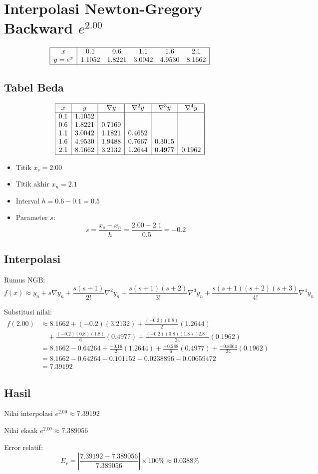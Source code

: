 \documentclass{article}
\begin{document}
\section*{Interpolasi Newton-Gregory Backward \( e^{2.00} \)}


\[
\begin{array}{|c|ccccc|}
\hline
x & 0.1 & 0.6 & 1.1 & 1.6 & 2.1 \\
y = e^x & 1.1052 & 1.8221 & 3.0042 & 4.9530 & 8.1662 \\
\hline
\end{array}
\]

\subsection*{Tabel Beda}
\[
\begin{array}{|c|c|c|c|c|c|}
\hline
x & y & \nabla y & \nabla^2 y & \nabla^3 y & \nabla^4 y \\
\hline
0.1 & 1.1052 & & & & \\
0.6 & 1.8221 & 0.7169 & & & \\
1.1 & 3.0042 & 1.1821 & 0.4652 & & \\
1.6 & 4.9530 & 1.9488 & 0.7667 & 0.3015 & \\
2.1 & 8.1662 & 3.2132 & 1.2644 & 0.4977 & 0.1962 \\
\hline
\end{array}
\]


\begin{itemize}
\item Titik \( x_s = 2.00 \)
\item Titik akhir \( x_n = 2.1 \)
\item Interval  \(h = 0.6 - 0.1 = 0.5 \)
\item Parameter \( s \):
\[
s = \frac{x_s - x_n}{h} = \frac{2.00 - 2.1}{0.5} = -0.2
\]
\end{itemize}

\subsection*{Interpolasi}
Rumus NGB:
\[
f(x) \approx y_n + s \nabla y_n + \frac{s(s+1)}{2!} \nabla^2 y_n + \frac{s(s+1)(s+2)}{3!} \nabla^3 y_n + \frac{s(s+1)(s+2)(s+3)}{4!} \nabla^4 y_n
\]

Substitusi nilai:
\[
\begin{aligned}
f(2.00) &\approx 8.1662 + (-0.2)(3.2132) + \frac{(-0.2)(0.8)}{2}(1.2644) \\
&\quad + \frac{(-0.2)(0.8)(1.8)}{6}(0.4977) + \frac{(-0.2)(0.8)(1.8)(2.8)}{24}(0.1962) \\
&= 8.1662 - 0.64264 + \frac{-0.16}{2}(1.2644) + \frac{-0.288}{6}(0.4977) + \frac{-0.8064}{24}(0.1962) \\
&= 8.1662 - 0.64264 - 0.101152 - 0.0238896 - 0.00659472 \\
&= 7.39192
\end{aligned}
\]

\subsection*{Hasil}
Nilai interpolasi \( e^{2.00} \approx 7.39192 \)

Nilai eksak \( e^{2.00} \approx 7.389056 \)

Error relatif:
\[
\text{\(E_r\)} = \left| \frac{7.39192 - 7.389056}{7.389056} \right| \times 100\% \approx 0.0388\%
\]
\end{document}
